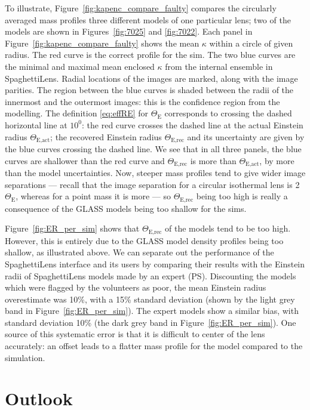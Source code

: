 \documentclass[usenatbib]{mn2e}
\newcommand{\spl}{SpaghettiLens\xspace}
\newcommand{\ERf}[1][]{$\Theta_\text{E#1}$\xspace} %
\newcommand{\figref}[1]{Figure~\ref{fig:#1}}
\newcommand{\Figref}[1]{Figure~\ref{fig:#1}}
\begin{document}
To illustrate, \figref{kapenc_compare_faulty} compares the circularly
averaged mass profiles three different models of one particular lens;
two of the models are shown in Figures~\ref{fig:7025} and
\ref{fig:7022}. Each panel in \figref{kapenc_compare_faulty} shows the
mean $\kappa$ within a circle of given radius.  The red curve is the
correct profile for the sim.  The two blue curves are the minimal and
maximal mean enclosed $\kappa$ from the internal ensemble in \spl.
Radial locations of the images are marked, along with the image
parities.  The region between the blue curves is shaded between the
radii of the innermost and the outermost images: this is the
confidence region from the modelling.  The definition \eqref{eq:effRE}
for \ERf corresponds to crossing the dashed horizontal line at $10^0$:
the red curve crosses the dashed line at the actual Einstein radius
\ERf[,act]; the recovered Einstein radius \ERf[,rec] and its
uncertainty are given by the blue curves crossing the dashed line.  We
see that in all three panels, the blue curves are shallower than the
red curve and \ERf[,rec] is more than \ERf[,act], by more than the
model uncertainties.  Now, steeper mass profiles tend to give wider
image separations --- recall that the image separation for a circular
isothermal lens is 2\ERf, whereas for a point mass it is more
\citep[see, e.g.,][]{2002LNP...608....1C} --- so \ERf[,rec] being too
high is really a consequence of the GLASS models being too shallow for
the sims.


\Figref{ER_per_sim} shows that \ERf[,rec] of the models tend to be too
high.  However, this is entirely due to the GLASS model density
profiles being too shallow, as illustrated above. We can separate out
the performance of the \spl interface and its users by comparing their
results with the  Einstein radii of \spl models made by an expert
(PS). Discounting the models which were flagged by the volunteers as
poor, the mean Einstein radius overestimate was 10\%, with a 15\%
standard deviation (shown by the light grey band in \Figref{ER_per_sim}).
The expert models show a similar bias,
with standard deviation 10\% (the dark grey band in \Figref{ER_per_sim}).
One source of this systematic error is that it is difficult to center
of the lens accurately: an offset leads to a flatter mass profile for
the model compared to the simulation.



\section{Outlook} \label{sec:todo}
\end{document}
